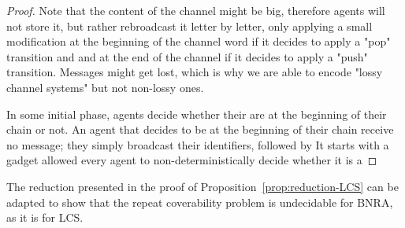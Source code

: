 \begin{proof}
Note that the content of the channel might be big, therefore agents will not store it, but rather rebroadcast it letter by letter, only applying a small modification at the beginning of the channel word if it decides to apply a "pop" transition and and at the end of the channel if it decides to apply a "push" transition. Messages might get lost, which is why we are able to encode "lossy channel systems" but not non-lossy ones.

In some initial phase, agents decide whether their are at the beginning of their chain or not. An agent that decides to be at the beginning of their chain receive no message; they simply broadcast their identifiers, followed by 
It starts with a gadget allowed every agent to non-deterministically decide whether it is a
\end{proof}
\fi

\begin{remark}
	The reduction presented in the proof of Proposition~\ref{prop:reduction-LCS} can be adapted to show that the repeat coverability problem is undecidable for BNRA, as it is for LCS.
\end{remark}
